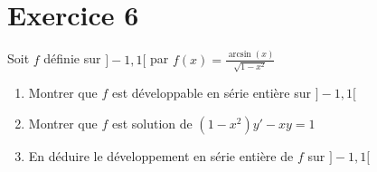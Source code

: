 \documentclass[11pt]{article}
\begin{document}
\section*{Exercice 6}

Soit $f$ définie sur $]-1,1[$ par $f(x)=\frac{\arcsin(x)}{\sqrt{1-x^2}}$

\begin{enumerate}
\item Montrer que $f$ est développable en série entière sur $]-1,1[$
\item Montrer que $f$ est solution de $(1-x^2)y' - xy=1$
\item En déduire le développement en série entière de $f$ sur $]-1,1[$
\end{enumerate}
\end{document}
